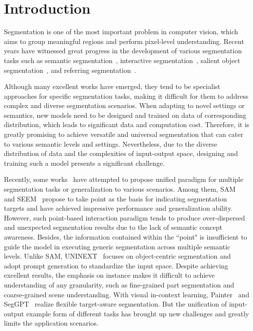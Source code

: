 \documentclass[10pt,twocolumn,letterpaper]{article}
\begin{document}
\vspace{-17pt}
\section{Introduction}
\vspace{-3pt}
Segmentation is one of the most important problem in computer vision, which aims to group meaningful regions and perform pixel-level understanding. Recent years have witnessed great progress in the development of various segmentation tasks such as semantic segmentation~\cite{fcn, mask2former, gkc}, interactive segmentation~\cite{sam, interactive1, qdmn, gsfm}, salient object segmentation~\cite{icon, rcsbnet}, and referring segmentation~\cite{lavt, soc}.

Although many excellent works have emerged, they tend to be specialist approaches for specific segmentation tasks, making it difficult for them to address complex and diverse segmentation scenarios. When adapting to novel settings or semantics, new models need to be designed and trained on data of corresponding distribution, which leads to significant data and computation cost. Therefore, it is greatly promising to achieve versatile and universal segmentation that can cater to various semantic levels and settings. Nevertheless, due to the diverse distribution of data and the complexities of input-output space, designing and training such a model presents a significant challenge.

Recently, some works~\cite{sam, seem, uninext, seggpt} have attempted to propose unified paradigm for multiple segmentation tasks or generalization to various scenarios. Among them, SAM~\cite{sam} and SEEM~\cite{seem} propose to take point as the basis for indicating segmentation targets and have achieved impressive performance and generalization ability. However, such point-based interaction paradigm tends to produce over-dispersed and unexpected segmentation results due to the lack of semantic concept awareness. Besides, the information contained within the ``point" is insufficient to guide the model in executing generic segmentation across multiple semantic levels. Unlike SAM, UNINEXT~\cite{uninext} focuses on object-centric segmentation and adopt prompt generation to standardize the input space. Despite achieving excellent results, the emphasis on instance makes it difficult to achieve understanding of any granularity, such as fine-grained part segmentation and coarse-grained scene understanding. With visual in-context learning, Painter~\cite{painter} and SegGPT~\cite{seggpt} realize flexible target-aware segmentation. But the unification of input-output example form of different tasks  has brought up new challenges and greatly limits the application scenarios.
\end{document}
